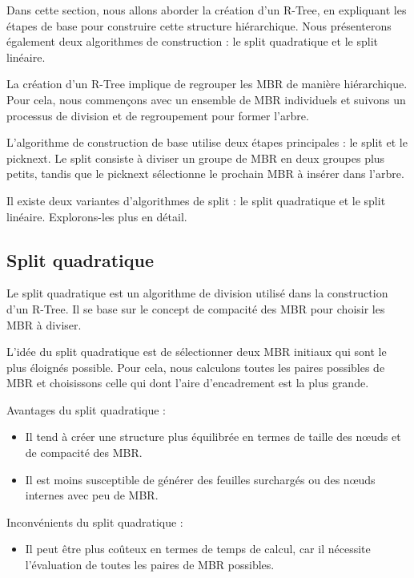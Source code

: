 \documentclass {article}
\begin{document}
Dans cette section, nous allons aborder la création d'un R-Tree, en expliquant les étapes de base 
pour construire cette structure hiérarchique. 
Nous présenterons également deux algorithmes de construction : 
le split quadratique et le split linéaire.

La création d'un R-Tree implique de regrouper les MBR de manière hiérarchique. 
Pour cela, nous commençons avec un ensemble de MBR individuels et suivons un processus 
de division et de regroupement pour former l'arbre.

L'algorithme de construction de base utilise deux étapes principales : le split et le picknext. 
Le split consiste à diviser un groupe de MBR en deux groupes plus petits, 
tandis que le picknext sélectionne le prochain MBR à insérer dans l'arbre.

Il existe deux variantes d'algorithmes de split : le split quadratique et le split linéaire. 
Explorons-les plus en détail.


\subsection {Split quadratique}
Le split quadratique est un algorithme de division utilisé dans la construction d'un R-Tree. 
Il se base sur le concept de compacité des MBR pour choisir les MBR à diviser.

L'idée du split quadratique est de sélectionner deux MBR initiaux qui sont le plus éloignés possible.
Pour cela, nous calculons toutes les paires possibles de MBR et choisissons celle qui dont 
l'aire d'encadrement est la plus grande.

Avantages du split quadratique :

\begin{itemize}
    \item Il tend à créer une structure plus équilibrée en termes de taille des nœuds et de 
	compacité des MBR.
    \item Il est moins susceptible de générer des feuilles surchargés ou des nœuds internes 
	avec peu de MBR.

\end{itemize}
Inconvénients du split quadratique :

\begin{itemize}
    \item Il peut être plus coûteux en termes de temps de calcul, car il nécessite l'évaluation 
	de toutes les paires de MBR possibles.
\end{itemize}
\end{document}
